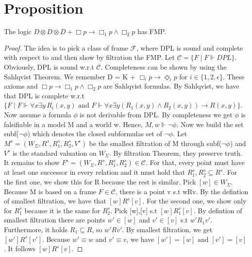 \documentclass[12pt, a4paper]{scrreprt}
\begin{document}
\section{Proposition}
The logic $D \otimes D \otimes D + \Box p \rightarrow \Box_1 p \land \Box_2 p$ has FMP.
\begin{proof}
The idea is to pick a class of frame $\mathcal{F}$, where DPL is sound and complete with respect to and then show by filtration the FMP. \newline \newline
Let $\mathcal{C} = \{F \mid F \Vdash DPL\}$. Obviously,  DPL is sound w.r.t $\mathcal{C}$. Completeness can be shown by using the Sahlqvist Theorem.
We remember D = K + $\Box_i p \rightarrow \Diamond_i p$ for $i \in \{1,2, \epsilon\}$. These axioms and $\Box p \rightarrow \Box_1 p \land \Box_2 p$ are Sahlqvist formulas. 
By Sahlqvist, we have that DPL is complete w.r.t $\{F \mid F \Vdash \forall x \exists y \, R_i(x,y) \mbox{ and } F \Vdash \forall x \exists y (R_1(x,y) \land R_2(x,y)) \rightarrow R(x,y)\}$. \newline \newline
Now assume a formula $\phi$ is not derivable from DPL. By completeness we get $\phi$ is falsifiable in a model M and a world w. Hence, $M,w \Vdash \neg \phi$. Now we build the set subf($\neg \phi$) which denotes the closed subformulas set of $\neg \phi$.
Let $M^s = (W_\Sigma, R^s, R^s_1, R^s_2, V^s)$ be the smallest filtration of M through subf($\neg \phi$) and $V^s$ is the standard valuation on $W_\Sigma$. By filtration Theorem, they preserve truth.
It remains to show $F^s = (W_\Sigma, R^s, R^s_1, R^s_2)\in  \mathcal{C}$. For that, every point must have at least one successor in every relation and it must hold that $R^s_1,R^s_2 \subseteq R^s$. For the first one, we show this for R because the rest is similar.
Pick $[w]\in W_\Sigma$. Because M is based on a frame $F \in \mathcal{C}$, there is a point v s.t wRv. By the defintion of smallest filtration, we have that $[w]R^s[v]$. For the second one, we show only for $R^s_1$ because it is the same for $R^s_2$.
Pick [w],[v] s.t $[w]R^s_1[v]$. By defintion of smallest filtration there are points $w' \in [w]$ and $v' \in [v]$ s.t $w'R_1v'$. Furthermore, it holds $R_1 \subseteq R$, so $w'Rv'$.
By smallest filtration, we get $[w']R^s[v']$. Because $w' \equiv w \mbox{ and } v' \equiv v$, we have $[w'] = [w] \mbox{ and } [v'] = [v]$. It follows $[w]R^s[v]$.

\end{proof}
\end{document}

